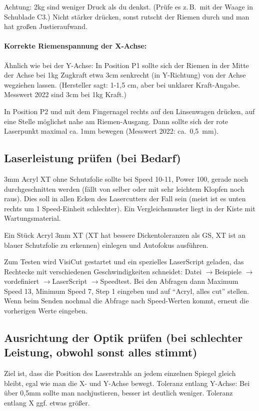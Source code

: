 \documentclass{\basedir/fablab-document}
\newcommand{\pfeil}{\ensuremath{\rightarrow}}
\begin{document}
	Achtung: 2kg sind weniger Druck als du denkst. (Prüfe es z.\,B.\ mit der Waage in Schublade C3.) Nicht stärker drücken, sonst rutscht der Riemen durch und man hat großen Justieraufwand.

	
	\paragraph{Korrekte Riemenspannung der X-Achse:} Ähnlich wie bei der Y-Achse: In Position P1 sollte sich der Riemen in der Mitte der Achse bei 1kg Zugkraft etwa 3cm senkrecht (in Y-Richtung) von der Achse wegziehen lassen. (Hersteller sagt: 1-1,5 cm, aber bei unklarer Kraft-Angabe. Messwert 2022 sind 3cm bei 1kg Kraft.)
	
	In Position P2 und mit dem Fingernagel rechts auf den Linsenwagen drücken, auf eine Stelle möglichst nahe am Riemen-Ausgang. Dann sollte sich der rote Laserpunkt maximal ca. 1mm bewegen (Messwert 2022: ca.\ 0,5\, mm).
	

\subsection{Laserleistung prüfen (bei Bedarf)}
3mm Acryl XT ohne Schutzfolie sollte bei Speed 10-11, Power 100, gerade noch durchgeschnitten werden (fällt von selber oder mit sehr leichtem Klopfen noch raus). Dies soll in allen Ecken des Lasercutters der Fall sein (meist ist es unten rechts um 1 Speed-Einheit schlechter). Ein Vergleichsmuster liegt in der Kiste mit Wartungsmaterial.

Ein Stück Acryl 3mm XT (XT hat bessere Dickentoleranzen als GS, XT ist an blauer Schutzfolie zu erkennen) einlegen und Autofokus ausführen.

Zum Testen wird VisiCut gestartet und ein spezielles LaserScript geladen, das Rechtecke mit verschiedenen Geschwindigkeiten schneidet: Datei \pfeil Beispiele \pfeil vordefiniert \pfeil LaserScript \pfeil Speedtest. Bei den Abfragen dann Maximum Speed 13, Minimum Speed 7, Step 1 eingeben und auf \enquote{Acryl, alles cut} stellen. Wenn beim Senden nochmal die Abfrage nach Speed-Werten kommt, erneut die vorherigen Werte eingeben.




\subsection{Ausrichtung der Optik prüfen (bei schlechter Leistung, obwohl sonst alles stimmt)}\label{ltt-wartung-optik}
Ziel ist, dass die Position des Laserstrahls an jedem einzelnen Spiegel gleich bleibt, egal wie man die X- und Y-Achse bewegt. Toleranz entlang Y-Achse: Bei über 0,5mm sollte man nachjustieren, besser ist deutlich weniger. Toleranz entlang X ggf. etwas größer.
\end{document}
